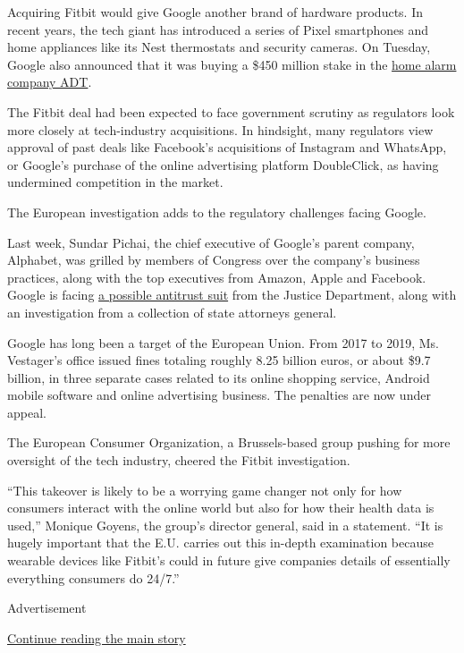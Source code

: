 Acquiring Fitbit would give Google another brand of hardware products.
In recent years, the tech giant has introduced a series of Pixel
smartphones and home appliances like its Nest thermostats and security
cameras. On Tuesday, Google also announced that it was buying a \$450
million stake in the
\href{https://www.globenewswire.com/news-release/2020/08/03/2071540/0/en/ADT-and-Google-Partner-To-Create-Leading-Smart-Home-Security-Offering.html}{home
alarm company ADT}.

The Fitbit deal had been expected to face government scrutiny as
regulators look more closely at tech-industry acquisitions. In
hindsight, many regulators view approval of past deals like Facebook's
acquisitions of Instagram and WhatsApp, or Google's purchase of the
online advertising platform DoubleClick, as having undermined
competition in the market.

The European investigation adds to the regulatory challenges facing
Google.

Last week, Sundar Pichai, the chief executive of Google's parent
company, Alphabet, was grilled by members of Congress over the company's
business practices, along with the top executives from Amazon, Apple and
Facebook. Google is facing
\href{https://www.nytimes.com/2020/06/25/technology/barr-google-investigation.html}{a
possible antitrust suit} from the Justice Department, along with an
investigation from a collection of state attorneys general.

Google has long been a target of the European Union. From 2017 to 2019,
Ms. Vestager's office issued fines totaling roughly 8.25 billion euros,
or about \$9.7 billion, in three separate cases related to its online
shopping service, Android mobile software and online advertising
business. The penalties are now under appeal.

The European Consumer Organization, a Brussels-based group pushing for
more oversight of the tech industry, cheered the Fitbit investigation.

``This takeover is likely to be a worrying game changer not only for how
consumers interact with the online world but also for how their health
data is used,'' Monique Goyens, the group's director general, said in a
statement. ``It is hugely important that the E.U. carries out this
in-depth examination because wearable devices like Fitbit's could in
future give companies details of essentially everything consumers do
24/7.''

Advertisement

\protect\hyperlink{after-bottom}{Continue reading the main story}

